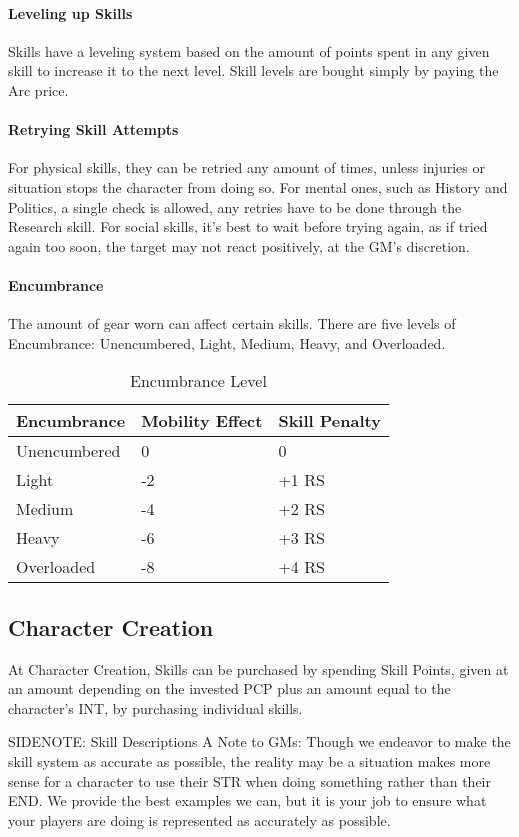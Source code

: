 \documentclass[oneside,11pt,english]{book}
\begin{document}
\paragraph{Leveling up Skills} Skills have a leveling system based on the amount of points spent in any given skill to increase it to the next level. Skill levels are bought simply by paying the Arc price.
\paragraph{Retrying Skill Attempts} For physical skills, they can be retried any amount of times, unless injuries or situation stops the character from doing so. For mental ones, such as History and Politics, a single check is allowed, any retries have to be done through the Research skill. For social skills, it’s best to wait before trying again, as if tried again too soon, the target may not react positively, at the GM’s discretion.
\paragraph{Encumbrance} The amount of gear worn can affect certain skills. There are five levels of Encumbrance: Unencumbered, Light, Medium, Heavy, and Overloaded. 
\begin{wraptable}{r}{10 cm}%
	\centering
	\caption{Encumbrance Level}
	\label{tab:Encumbrance Penalties}
	\begin{tabu} spread 0pt{XX[c]X}
Encumbrance		&Mobility Effect&Skill Penalty\\\toprule
Unencumbered	&0				&0\\
Light			&-2				&+1 RS\\
Medium			&-4				&+2 RS\\
Heavy			&-6				&+3 RS\\
Overloaded		&-8				&+4 RS\\
	\end{tabu}
\end{wraptable}


\subsection{Character Creation}
At Character Creation, Skills can be purchased by spending Skill Points, given at an amount depending on the invested PCP plus an amount equal to the character’s INT, by purchasing individual skills.


SIDENOTE: Skill Descriptions %
A Note to GMs: Though we endeavor to make the skill system as accurate as possible, the reality may be 
a situation makes more sense for a character to use their STR when doing something rather than their 
END. We provide the best examples we can, but it is your job to ensure what your players are doing is 
represented as accurately as possible. 
\end{document}

